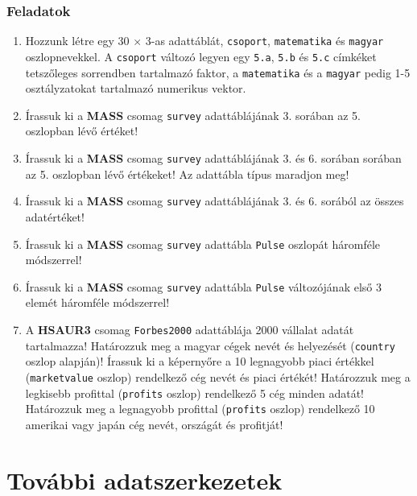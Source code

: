 \documentclass[
]{book}
\makeatletter
\providecommand{\tightlist}{%
  \setlength{\itemsep}{0pt}\setlength{\parskip}{0pt}}
\newenvironment{kframe}{%
\medskip{}
\setlength{\fboxsep}{.8em}
 \def\at@end@of@kframe{}%
 \ifinner\ifhmode%
  \def\at@end@of@kframe{\end{minipage}}%
  \begin{minipage}{\columnwidth}%
 \fi\fi%
 \def\FrameCommand##1{\hskip\@totalleftmargin \hskip-\fboxsep
 \colorbox{shadecolor}{##1}\hskip-\fboxsep
     \hskip-\linewidth \hskip-\@totalleftmargin \hskip\columnwidth}%
 \MakeFramed {\advance\hsize-\width
   \@totalleftmargin\z@ \linewidth\hsize
   \@setminipage}}%
 {\par\unskip\endMakeFramed%
 \at@end@of@kframe}
\newenvironment{rmdblock}[1]
  {
  \begin{itemize}
  \renewcommand{\labelitemi}{
    \raisebox{-.7\height}[0pt][0pt]{
      {\setkeys{Gin}{width=3em,keepaspectratio}\texttt{[image: images/\#1]}}
    }
  }
  \setlength{\fboxsep}{1em}
  \begin{kframe}
  \item
  }
  {
  \end{kframe}
  \end{itemize}
  }
\newenvironment{rmdexercise}
  {\begin{rmdblock}{exercise}}
  {\end{rmdblock}}
\makeatother
\begin{document}
\hypertarget{az-r-nyelv-9-exercise}{%
\subsubsection{Feladatok}\label{az-r-nyelv-9-exercise}}

\begin{rmdexercise}
\begin{enumerate}
\def\labelenumi{\arabic{enumi}.}
\tightlist
\item
  Hozzunk létre egy 30 \(\times\) 3-as adattáblát, \texttt{csoport}, \texttt{matematika} és \texttt{magyar} oszlopnevekkel. A \texttt{csoport} változó legyen egy \texttt{5.a}, \texttt{5.b} és \texttt{5.c} címkéket tetszőleges sorrendben tartalmazó faktor, a \texttt{matematika} és a \texttt{magyar} pedig 1-5 osztályzatokat tartalmazó numerikus vektor.
\item
  Írassuk ki a \textbf{MASS} csomag \texttt{survey} adattáblájának 3. sorában az 5. oszlopban lévő értéket!
\item
  Írassuk ki a \textbf{MASS} csomag \texttt{survey} adattáblájának 3. és 6. sorában sorában az 5. oszlopban lévő értékeket! Az adattábla típus maradjon meg!
\item
  Írassuk ki a \textbf{MASS} csomag \texttt{survey} adattáblájának 3. és 6. sorából az összes adatértéket!
\item
  Írassuk ki a \textbf{MASS} csomag \texttt{survey} adattábla \texttt{Pulse} oszlopát háromféle módszerrel!
\item
  Írassuk ki a \textbf{MASS} csomag \texttt{survey} adattábla \texttt{Pulse} változójának első 3 elemét háromféle módszerrel!
\item
  A \textbf{HSAUR3} csomag \texttt{Forbes2000} adattáblája 2000 vállalat adatát tartalmazza! Határozzuk meg a magyar cégek nevét és helyezését (\texttt{country} oszlop alapján)! Írassuk ki a képernyőre a 10 legnagyobb piaci értékkel (\texttt{marketvalue} oszlop) rendelkező cég nevét és piaci értékét! Határozzuk meg a legkisebb profittal (\texttt{profits} oszlop) rendelkező 5 cég minden adatát! Határozzuk meg a legnagyobb profittal (\texttt{profits} oszlop) rendelkező 10 amerikai vagy japán cég nevét, országát és profitját!
\end{enumerate}
\end{rmdexercise}

\hypertarget{tovuxe1bbi-adatszerkezetek}{%
\section{További adatszerkezetek}\label{tovuxe1bbi-adatszerkezetek}}
\end{document}
